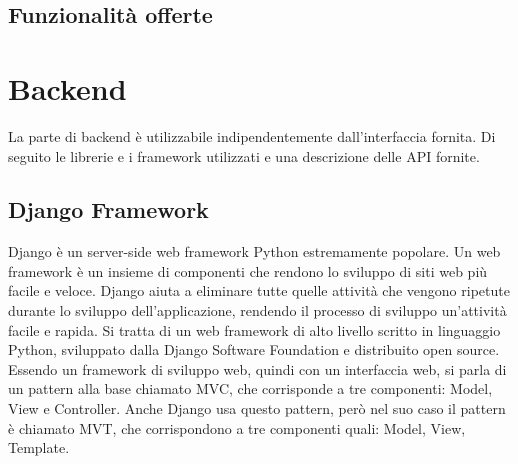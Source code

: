 \documentclass{article}
\begin{document}
\subsection{Funzionalità offerte}
\section{Backend}
La parte di backend è utilizzabile indipendentemente dall'interfaccia fornita. Di seguito le librerie e i framework utilizzati e una descrizione delle API fornite. 
\subsection{Django Framework}
Django è un server-side web framework Python estremamente popolare. Un web framework è un insieme di componenti che rendono lo sviluppo di siti web più facile e veloce. 
Django aiuta a eliminare tutte quelle attività che vengono ripetute durante lo sviluppo dell'applicazione, rendendo il processo di sviluppo un'attività facile e rapida. 
Si tratta di un web framework di alto livello scritto in linguaggio Python, sviluppato dalla Django Software Foundation e distribuito open source. 
Essendo un framework di sviluppo web, quindi con un interfaccia web, si parla di un pattern alla base chiamato MVC, che corrisponde a tre componenti: Model, View e Controller.
Anche Django usa questo pattern, però nel suo caso il pattern è chiamato MVT, che corrispondono a tre componenti quali: Model, View, Template.
\end{document}
